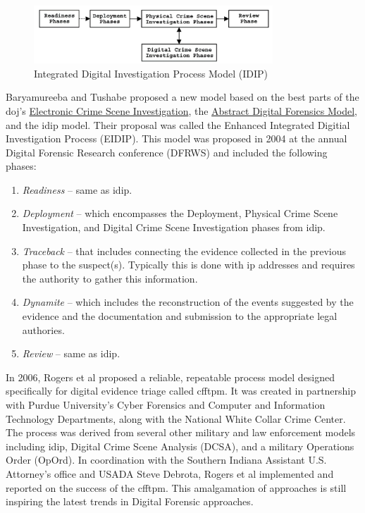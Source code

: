 \documentclass[12pt]{article}
\begin{document}
\begin{figure}[H]
  \centering
    \includegraphics[width=0.8\textwidth]{images/IDIP.png}
  \caption{Integrated Digital Investigation Process Model (IDIP)}
  \label{fig:IDIP}
\end{figure}

Baryamureeba and Tushabe\cite{baryamureeba2004enhanced} proposed a new model 
based on the best parts of the \gls{doj}'s \uline{Electronic Crime
Scene Investigation}, the \uline{Abstract Digital Forensics Model}, and 
the \gls{idip} model.  Their proposal was called the
Enhanced Integrated Digitial Investigation Process (EIDIP).
This model was proposed in 2004 at the annual Digital Forensic Research conference
(DFRWS)\cite{baryamureeba2004enhanced} and included the following phases:

\vspace{0.5 cm}
\begin{enumerate}
  \item {\em Readiness} -- same as \gls{idip}.
  \item {\em Deployment} -- which encompasses the Deployment,
  Physical Crime Scene Investigation, and Digital Crime Scene
  Investigation phases from \gls{idip}.
  \item {\em Traceback} -- that includes connecting the evidence collected
  in the previous phase to the suspect(s).  Typically this is done with \gls{ip}
  addresses and requires the authority to gather this information.
  \item {\em Dynamite} -- which includes the reconstruction of the events
  suggested by the evidence and the documentation and submission to the
  appropriate legal authories.
  \item {\em Review} -- same as \gls{idip}.
\end{enumerate}
\vspace{0.5 cm}

In 2006, Rogers et al\cite{rogers2006computer} proposed a reliable, repeatable process 
model designed specifically for digital evidence triage called
\gls{cfftpm}. It was created in partnership
with Purdue University's Cyber Forensics and Computer and Information
Technology Departments, along with the National White Collar Crime
Center\cite{rogers2006computer}.
The process was derived from several other military and law enforcement models
including \gls{idip}, 
Digital Crime Scene Analysis (DCSA),
and a military Operations Order (OpOrd).  In coordination with the Southern Indiana 
Assistant U.S. Attorney's office and 
USADA Steve Debrota, Rogers et al\cite{rogers2006computer} implemented and reported
on the success of the \gls{cfftpm}.  This amalgamation of approaches is still inspiring 
the latest trends in Digital Forensic approaches.\\
\end{document}
